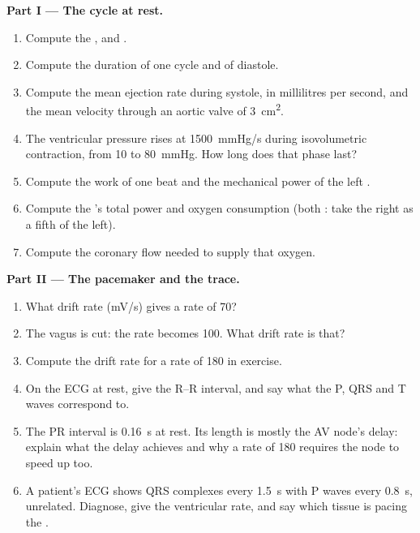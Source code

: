 \begin{problem}
\medskip
\noindent\textbf{Part I --- The cycle at rest.}
\begin{enumerate}
  \item Compute the ,  and .
  \item Compute the duration of one cycle and of diastole.
  \item Compute the mean ejection rate during systole, in
        millilitres per second, and the mean velocity through an
        aortic valve of \qty{3}{cm^2}.
  \item The ventricular pressure rises at \qty{1500}{mmHg/s} during
        isovolumetric contraction, from 10 to \qty{80}{mmHg}. How
        long does that phase last?
  \item Compute the work of one beat and the mechanical power of the
        left .
  \item Compute the 's total power and oxygen consumption
        (both : take the right as a fifth of the left).
  \item Compute the coronary  flow needed to supply that oxygen.
\end{enumerate}

\medskip
\noindent\textbf{Part II --- The pacemaker and the trace.}
\begin{enumerate}[resume]
  \item What drift rate (\unit{mV/s}) gives a rate of 70?
  \item The vagus is cut: the rate becomes 100. What drift rate is
        that?
  \item Compute the drift rate for a rate of 180 in exercise.
  \item On the ECG at rest, give the R--R interval, and say what
        the P, QRS and T waves correspond to.
  \item The PR interval is \qty{0.16}{s} at rest. Its length is
        mostly the AV node's delay: explain what the delay achieves
        and why a rate of 180 requires the node to speed up too.
  \item A patient's ECG shows QRS complexes every \qty{1.5}{s} with P
        waves every \qty{0.8}{s}, unrelated. Diagnose, give the
        ventricular rate, and say which tissue is pacing the
        .
\end{enumerate}


\end{problem}
